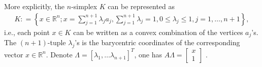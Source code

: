 \documentclass[11pt,a4paper,center,notitlepage]{article}
\numberwithin{equation}{section}
\begin{document}
More explicitly, the $n$-simplex $K$ can be represented as 
\begin{align}
K: = \left\{ {x \in {\mathbb{R}^n};x = \sum\limits_{j = 1}^{n + 1} {{\lambda _j}{a_j}} ,\sum\limits_{j = 1}^{n + 1} {{\lambda _j}}  = 1,0 \le {\lambda _j} \le 1,j = 1, \ldots ,n + 1} \right\},
\end{align}
i.e., each point $x\in K$ can be written as a convex combination of the vertices $a_j$'s. The $\left(n+1\right)$-tuple $\lambda _j$'s is the barycentric coordinates of the corresponding vector $x\in \mathbb{R}^n$. Denote $\Lambda =\left[\lambda _1,\ldots\lambda _{n+1}\right]^T$, one has $A\Lambda  = \left[ {\begin{array}{*{20}{c}}
x\\
1
\end{array}} \right]$ . 
\end{document}
